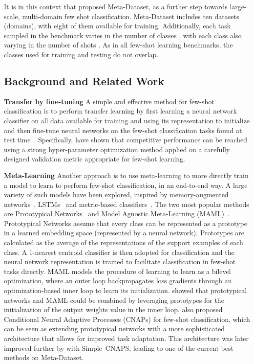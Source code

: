 \documentclass{article}
\begin{document}
It is in this context that \citet{triantafillou2019meta} proposed Meta-Dataset, as a further step towards large-scale, multi-domain few shot classification. 
Meta-Dataset includes ten datasets (domains), with eight of them available for training. Additionally, each task sampled in the benchmark varies in the number of classes , with each class also varying in the number of shots . As in all few-shot learning benchmarks, the classes used for training and testing do not overlap.



\subsection{Background and Related Work} 

{\bf Transfer by fine-tuning} 
A simple and effective method for few-shot classification is to perform transfer learning by first learning a neural network classifier on all data available for training and using its representation to initialize and then fine-tune neural networks on the few-shot classification tasks found at test time~\cite{closerlook,triantafillou2019meta,DhillonG2020,saikia2020optimized}. Specifically, \citet{saikia2020optimized} have shown that competitive performance can be reached using a strong hyper-parameter optimization method applied on a carefully designed validation metric appropriate for few-shot learning.

{\bf Meta-Learning} Another approach is to use meta-learning to more directly train a model to learn to perform few-shot classification, in an end-to-end way.
A large variety of such models have been explored, inspired by
memory-augmented networks~\cite{santoro2016meta}, LSTMs~\cite{ravi2016optimization} and metric-based classifiers~\cite{vinyals2016matching}.
The two most popular methods are Prototypical Networks~\cite{snell2017prototypical} and Model Agnostic Meta-Learning (MAML)~\cite{finn2017model}. Prototypical Networks assume that every class can be represented as a prototype in a learned embedding space (represented by a neural network). Prototypes are calculated as the average of the representations of the support examples of each class. A 1-nearest centroid classifier is then adopted for classification and the neural network representation is trained to facilitate classification in few-shot tasks directly.
MAML models the procedure of learning to learn as a bilevel optimization, where an outer loop backpropagates loss gradients through an optimization-based inner loop to learn its initialization.
\citet{triantafillou2019meta} showed that prototypical networks and MAML could be combined by leveraging prototypes for the initialization of the output weights value in the inner loop. 
\citet{requeima2019fast} also proposed Conditional Neural Adaptive Processes (CNAPs) for few-shot classification, which can be seen as extending prototypical networks with a more sophisticated architecture that allows for improved task adaptation. This architecture was later improved further by \citet{bateni2020improved} with Simple~CNAPS, leading to one of the current best methods on Meta-Dataset.
\end{document}
